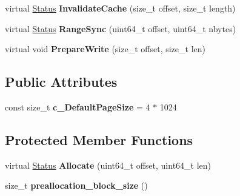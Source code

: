 \begin{DoxyCompactItemize}
\item 
virtual \hyperlink{classrocksdb_1_1Status}{Status} {\bfseries Invalidate\+Cache} (size\+\_\+t offset, size\+\_\+t length)\hypertarget{classrocksdb_1_1WritableFile_aecbf49617c8ba66165b1caefc1305798}{}\label{classrocksdb_1_1WritableFile_aecbf49617c8ba66165b1caefc1305798}

\item 
virtual \hyperlink{classrocksdb_1_1Status}{Status} {\bfseries Range\+Sync} (uint64\+\_\+t offset, uint64\+\_\+t nbytes)\hypertarget{classrocksdb_1_1WritableFile_a8114ce078068bb659aac8f78cbd114b4}{}\label{classrocksdb_1_1WritableFile_a8114ce078068bb659aac8f78cbd114b4}

\item 
virtual void {\bfseries Prepare\+Write} (size\+\_\+t offset, size\+\_\+t len)\hypertarget{classrocksdb_1_1WritableFile_a5df5c0f168043f7c015205b861217c03}{}\label{classrocksdb_1_1WritableFile_a5df5c0f168043f7c015205b861217c03}

\end{DoxyCompactItemize}
\subsection*{Public Attributes}
\begin{DoxyCompactItemize}
\item 
const size\+\_\+t {\bfseries c\+\_\+\+Default\+Page\+Size} = 4 $\ast$ 1024\hypertarget{classrocksdb_1_1WritableFile_a20f0caa7e16e0f9cb473ede649a0c094}{}\label{classrocksdb_1_1WritableFile_a20f0caa7e16e0f9cb473ede649a0c094}

\end{DoxyCompactItemize}
\subsection*{Protected Member Functions}
\begin{DoxyCompactItemize}
\item 
virtual \hyperlink{classrocksdb_1_1Status}{Status} {\bfseries Allocate} (uint64\+\_\+t offset, uint64\+\_\+t len)\hypertarget{classrocksdb_1_1WritableFile_abb429092498957e5374ea7be106ec29e}{}\label{classrocksdb_1_1WritableFile_abb429092498957e5374ea7be106ec29e}

\item 
size\+\_\+t {\bfseries preallocation\+\_\+block\+\_\+size} ()\hypertarget{classrocksdb_1_1WritableFile_a8f4d8ebe099b4acf7d8b46a277bbdc80}{}\label{classrocksdb_1_1WritableFile_a8f4d8ebe099b4acf7d8b46a277bbdc80}

\end{DoxyCompactItemize}
